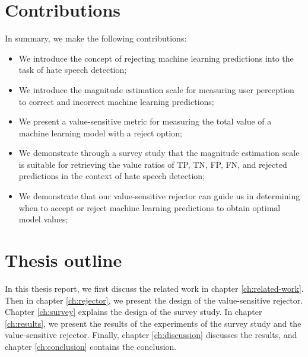 \section{Contributions}
In summary, we make the following contributions:
%
\begin{itemize}
	\item We introduce the concept of rejecting machine learning predictions into the task of hate speech detection;
	\item We introduce the magnitude estimation scale for measuring user perception to correct and incorrect machine learning predictions;
	\item We present a value-sensitive metric for measuring the total value of a machine learning model with a reject option;
	\item We demonstrate through a survey study that the magnitude estimation scale is suitable for retrieving the value ratios of TP, TN, FP, FN, and rejected predictions in the context of hate speech detection;
	\item We demonstrate that our value-sensitive rejector can guide us in determining when to accept or reject machine learning predictions to obtain optimal model values;
\end{itemize}

\section{Thesis outline}
%
In this thesis report, we first discuss the related work in chapter \ref{ch:related-work}.
%
Then in chapter \ref{ch:rejector}, we present the design of the value-sensitive rejector.
%
Chapter \ref{ch:survey} explains the design of the survey study.
%
In chapter \ref{ch:results}, we present the results of the experiments of the survey study and the value-sensitive rejector.
%
Finally, chapter \ref{ch:discussion} discusses the results, and chapter \ref{ch:conclusion} contains the conclusion.
